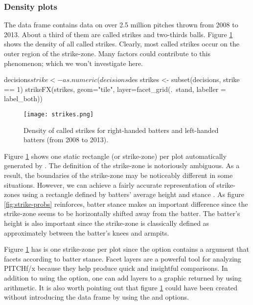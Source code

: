 \begin{article}
\subsubsection{Density plots}

The  data frame contains data on over 2.5 million
pitches thrown from 2008 to 2013. About a third of them are called
strikes and two-thirds balls. Figure \ref{fig:STRIKES} shows the
density of all called strikes. Clearly, most called strikes occur
on the outer region of the strike-zone. Many factors could contribute
to this phenomenon; which we won't investigate here.

\begin{Schunk}
\begin{Sinput}
decisions$strike <- as.numeric(decisions$des %in% "Called Strike")
strikes <- subset(decisions, strike == 1)
strikeFX(strikes, geom="tile", layer=facet_grid(.~stand, labeller = label_both))
\end{Sinput}
\end{Schunk}


\begin{figure}[h]
\centerline{\texttt{[image: strikes.png]}}

\caption{\label{fig:STRIKES} Density of called strikes for right-handed batters
and left-handed batters (from 2008 to 2013).}
\end{figure}


Figure \ref{fig:STRIKES} shows one static rectangle (or strike-zone)
per plot automatically generated by . The definition
of the strike-zone is notoriously ambiguous. As a result, the boundaries
of the strike-zone may be noticeably different in some situations.
However, we can achieve a fairly accurate representation of strike-zones
using a rectangle defined by batters' average height and stance \citet{Strikezones}.
As figure \ref{fig:strike-probs} reinforces, batter stance makes
an important difference since the strike-zone seems to be horizontally
shifted away from the batter. The batter's height is also important
since the strike-zone is classically defined as approximately between
the batter's knees and armpits.

Figure \ref{fig:STRIKES} has is one strike-zone per plot since the
 option contains a  argument that facets
according to batter stance. Facet layers are a powerful tool for analyzing
PITCHf/x because they help produce quick and insightful comparisons.
In addition to using the  option, one can add layers
to a graphic returned by  using  arithmetic.
It is also worth pointing out that figure \ref{fig:STRIKES} could
have been created without introducing the  data frame
by using the  and  options. 


\end{article}
